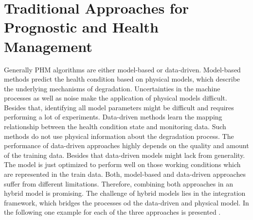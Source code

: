 \begin{comment}
The number of IMFs extracted roughly equals $log_{2}(N)$ where $N$ is the number of extrema in the signal. The EMD decomposes the non-stationary signal in its locally and non-overlapping component IMFs. This process does not need any predefined wave-forms like the wavelet transformations. The selection of the IMFs is an automatic and adaptive time-variant filtering \cite{Faltermeier2010}. Compared to the Fourier and Wavelet transform, the decomposition of the signal in several IMFS does not divide the signal into fixed frequency components, which gives this method a higher time-frequency resolution \cite{Verstraete2017}. The popular Hilbert-Huang Transform (HHT) combines the EMD with the Hilbert spectral analysis, where the Hilbert transform is applied to each of the detected IMFs. A corresponding analytical signal can be constructed. Also the Hilbert amplitude and energy spectrum can be derived. For more Hilbert-specific details Feng et al. \cite{FENG2013} can be studied.
\end{comment}

\section{Traditional Approaches for Prognostic and Health Management}

Generally PHM algorithms are either model-based or data-driven. Model-based methods predict the health condition based on physical models, which describe the underlying mechanisms of degradation. Uncertainties in the machine processes as well as noise make the application of physical models difficult. Besides that, identifying all model parameters might be difficult and requires performing a lot of experiments. Data-driven methods learn the mapping relationship between the health condition state and monitoring data. Such methods do not use physical information about the degradation process. The performance of data-driven approaches highly depends on the quality and amount of the training data. Besides that data-driven models might lack from generality. The model is just optimized to perform well on those working conditions which are represented in the train data. Both, model-based and data-driven approaches suffer from different limitations. Therefore, combining both approaches in an hybrid model is promising. The challenge of hybrid models lies in the integration framework, which bridges the processes od the data-driven and physical model. In the following one example for each of the three approaches is presented \cite{DENG2020}. 

